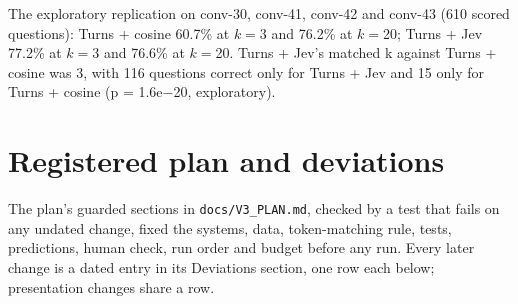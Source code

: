 \documentclass[11pt]{article}
\newcommand{\src}[1]{}
\begin{document}
The exploratory replication on conv-30, conv-41, conv-42 and conv-43 (610\src{bench/results/v3/batch\_a\_report.json\#exploratory/L0 k3/questions} scored questions): Turns + cosine 60.7\%\src{bench/results/v3/batch\_a\_report.json\#exploratory/L0 k3/accuracy} at $k{=}$3 and 76.2\%\src{bench/results/v3/batch\_a\_report.json\#exploratory/L0 k20/accuracy} at $k{=}$20; Turns + Jev 77.2\%\src{bench/results/v3/batch\_a\_report.json\#exploratory/T0R k3/accuracy} at $k{=}$3 and 76.6\%\src{bench/results/v3/batch\_a\_report.json\#exploratory/T0R k20/accuracy} at $k{=}$20. Turns + Jev's matched k against Turns + cosine was 3\src{bench/results/v3/batch\_a\_report.json\#token\_match/L0 (exploratory)/t0r\_k}, with 116\src{bench/results/v3/batch\_a\_report.json\#exploratory/T0R vs L0 (matched)/only\_a} questions correct only for Turns + Jev and 15\src{bench/results/v3/batch\_a\_report.json\#exploratory/T0R vs L0 (matched)/only\_b} only for Turns + cosine (p = 1.6e$-$20\src{bench/results/v3/batch\_a\_report.json\#exploratory/T0R vs L0 (matched)/p\_two\_sided}, exploratory).

\FloatBarrier
\section{Registered plan and deviations}\label{app:B}
The plan's guarded sections in \texttt{docs/\allowbreak{}V3\_\allowbreak{}PLAN.md}, checked by a test that fails on any undated change, fixed the systems, data, token-matching rule, tests, predictions, human check, run order and budget before any run. Every later change is a dated entry in its Deviations section, one row each below; presentation changes share a row.
\end{document}
